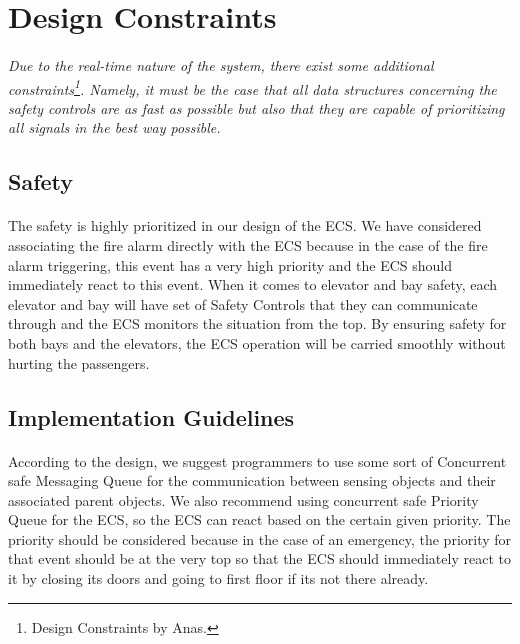 \documentclass[12pt]{article}
\begin{document}
    
    
    
\section{Design Constraints} \label{cons}
\paragraph{} \textit{Due to the real-time nature of the system, there exist some additional 
constraints\footnote{Design Constraints by Anas.}. Namely, it must be the case that all data 
structures concerning the safety controls are as fast as possible but also that they are capable 
of prioritizing all signals in the best way possible.}

    \subsection{Safety}
    \paragraph{} The safety is highly prioritized in our design of the ECS. We have 
    considered associating the fire alarm directly with the ECS because in the case 
    of the fire alarm triggering, this event has a very high priority and the ECS 
    should immediately react to this event. When it comes to elevator and bay safety, 
    each elevator and bay will have set of Safety Controls that they can communicate 
    through and the ECS monitors the situation from the top. By ensuring safety for 
    both bays and the elevators, the ECS operation will be carried smoothly without 
    hurting the passengers.

    \subsection{Implementation Guidelines}
    \paragraph{} According to the design, we suggest programmers to use some sort of 
    Concurrent safe Messaging Queue for the communication between sensing objects and 
    their associated parent objects. We also recommend using concurrent safe Priority 
    Queue for the ECS, so the ECS can react based on the certain given priority. The 
    priority should be considered because in the case of an emergency, the priority 
    for that event should be at the very top so that the ECS should immediately react 
    to it by closing its doors and going to first floor if its not there already.
\end{document}
